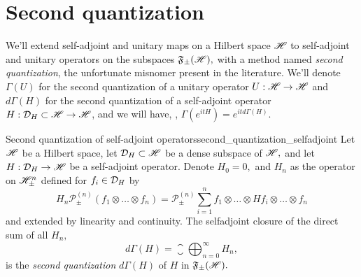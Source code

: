 \section{Second quantization}
We'll extend self-adjoint and unitary maps on a Hilbert space \(\mathscr{H}\) to self-adjoint and unitary operators on the subspaces \(\mathfrak{F}_\pm(\mathscr{H}),\) with a method named \emph{second quantization}, the unfortunate misnomer present in the literature. We'll denote \(\Gamma(U)\) for the second quantization of a unitary operator \(U : \mathscr{H} \to \mathscr{H}\) and \(d{\Gamma}(H)\) for the second quantization of a self-adjoint operator \(H : \mathcal{D}_{H} \subset \mathscr{H} \to \mathscr{H}\), and we will have, , \(\Gamma(e^{it H}) = e^{i t d\Gamma(H)}.\)

\begin{definition}{Second quantization of self-adjoint operators}{second_quantization_selfadjoint}
    Let \(\mathscr{H}\) be a Hilbert space, let \(\mathcal{D}_{H} \subset \mathscr{H}\) be a dense subspace of \(\mathscr{H},\) and let \(H : \mathcal{D}_{H} \to \mathscr{H}\) be a self-adjoint operator. Denote \(H_0 = 0,\) and \(H_n \) as the operator on \(\mathscr{H}_\pm^n\) defined for \(f_i \in \mathcal{D}_{H}\) by
    \begin{equation*}
        H_n \mathscr{P}_\pm^{(n)}\left(f_1 \otimes \dots \otimes f_n\right) = \mathscr{P}_{\pm}^{(n)} \sum_{i = 1}^n{f_1 \otimes \dots \otimes H f_i \otimes \dots \otimes f_n}
    \end{equation*}
    and extended by linearity and continuity. The selfadjoint closure of the direct sum of all \(H_n,\)
    \begin{equation*}
        d \Gamma(H) = \closure{\bigoplus_{n = 0}^\infty H_n},
    \end{equation*}
    is the \emph{second quantization} \(d \Gamma(H)\) of \(H\) in \(\mathfrak{F}_\pm(\mathscr{H}).\)
\end{definition}

